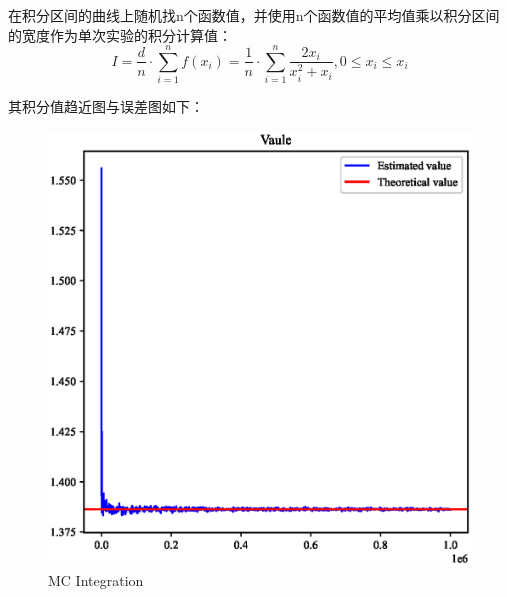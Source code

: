 \documentclass[12pt,a4paper]{article}%
\begin{document}
在积分区间的曲线上随机找n个函数值，并使用n个函数值的平均值乘以积分区间的宽度作为单次实验的积分计算值：
\[I=\frac{d}{n}\cdot \sum_{i=1}^{n}f(x_i)=\frac{1}{n}\cdot\sum_{i=1}^{n}\frac{2x_i}{x_i^2+x_i},0\leq x_i\leq x_i\]

其积分值趋近图与误差图如下：

\begin{figure}[H]%
    \centering
    \begin{minipage}{0.48\textwidth}
        \centering
        \includegraphics[width=1.1\textwidth]{函数.eps}
        \caption{\fontsize{10pt}{15pt}\selectfont MC Integration}
    \end{minipage}
    \hspace{0cm}%
    \hfill%
    \begin{minipage}{0.48\textwidth}
        \centering

\end{minipage}
\end{figure}
\end{document}
